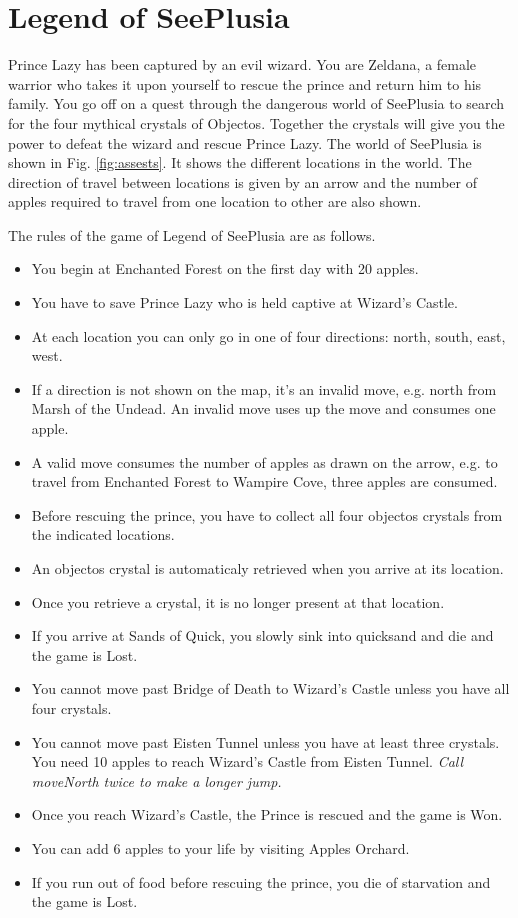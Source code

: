 \documentclass[a4paper,12pt]{article}
\begin{document}
	\newpage
	
	\section{Legend of SeePlusia}

	Prince Lazy has been captured by an evil wizard. You are Zeldana, a female warrior who takes it upon
	yourself to rescue the prince and return him to his family. You go off on a quest through the dangerous
	world of SeePlusia to search for the four mythical crystals of Objectos. Together the crystals will give
	you the power to defeat the wizard and rescue Prince Lazy.
	The world of SeePlusia is shown in Fig. \ref{fig:assests}. It shows the different locations in the world. The direction of travel between locations is given by an arrow and the number of apples required to travel from one location to other are also shown.
	
	The rules of the game of Legend of SeePlusia are as follows.
\begin{itemize}
	\item You begin at Enchanted Forest on the first day with 20 apples.
	\item You have to save Prince Lazy who is held captive at Wizard's Castle.
	\item At each location you can only go in one of four directions: north, south, east, west.
	\item If a direction is not shown on the map, it's an invalid move, e.g. north from
	Marsh of the Undead. An invalid move uses up the move and consumes one apple.
	\item A valid move consumes the number of apples as drawn on the arrow, e.g. to travel from Enchanted Forest to Wampire Cove, three apples are consumed.
	\item Before rescuing the prince, you have to collect all four objectos crystals from the indicated locations.
	\item An objectos crystal is automaticaly retrieved when you arrive at its location.
	\item Once you retrieve a crystal, it is no longer present at that location.
	\item If you arrive at Sands of Quick, you slowly sink into quicksand and die and the game is Lost.
	\item You cannot move past Bridge of Death to Wizard's Castle unless you have all four crystals.
	\item You cannot move past Eisten Tunnel unless you have at least three crystals. You need 10 apples to reach Wizard's Castle from Eisten Tunnel. \textit{Call moveNorth twice to make a longer jump.}
	\item Once you reach Wizard’s Castle, the Prince is rescued and the game is Won.
	\item You can add 6 apples to your life by visiting Apples Orchard.
	\item If you run out of food before rescuing the prince, you die of starvation and the game is Lost.
\end{itemize}
	
\end{document}
